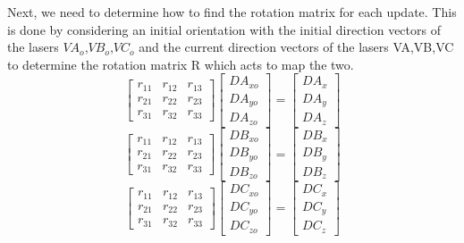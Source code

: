 \documentclass[a4paper]{article}
\begin{document}
Next, we need to determine how to find the rotation matrix for each update. This is done by considering an initial orientation with the initial direction vectors of the lasers $VA_o$,$VB_o$,$VC_o$ and the current direction vectors of the lasers VA,VB,VC to determine the rotation matrix R which acts to map the two.
\begin{equation}
\begin{bmatrix}
	r_{11} & r_{12} & r_{13}\\
	r_{21} & r_{22} & r_{23}\\
	r_{31} & r_{32} & r_{33}
\end{bmatrix} \begin{bmatrix}
DA_{xo} \\ DA_{yo} \\ DA_{zo}  
\end{bmatrix} = \begin{bmatrix}
DA_{x} \\ DA_{y} \\ DA_{z}  
\end{bmatrix}
\end{equation} 
\begin{equation}
\begin{bmatrix}
r_{11} & r_{12} & r_{13}\\
r_{21} & r_{22} & r_{23}\\
r_{31} & r_{32} & r_{33}
\end{bmatrix} \begin{bmatrix}
DB_{xo} \\ DB_{yo} \\ DB_{zo}  
\end{bmatrix} = \begin{bmatrix}
DB_{x} \\ DB_{y} \\ DB_{z}  
\end{bmatrix}
\end{equation}
\begin{equation}
\begin{bmatrix}
r_{11} & r_{12} & r_{13}\\
r_{21} & r_{22} & r_{23}\\
r_{31} & r_{32} & r_{33}
\end{bmatrix} \begin{bmatrix}
DC_{xo} \\ DC_{yo} \\ DC_{zo}  
\end{bmatrix} = \begin{bmatrix}
DC_{x} \\ DC_{y} \\ DC_{z}  
\end{bmatrix}
\end{equation}
\end{document}
